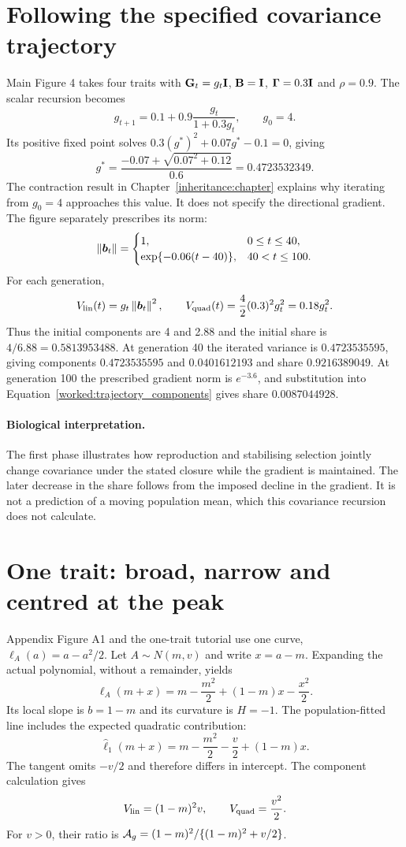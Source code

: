 \section{Following the specified covariance trajectory}
\label{worked:main4}

Main Figure 4 takes four traits with $\mathbf{G}_t=g_t\mathbf{I}$, $\mathbf{B}=\mathbf{I}$,
$\boldsymbol{\Gamma}=0.3\mathbf{I}$ and $\rho=0.9$. The scalar recursion becomes
\[
 g_{t+1}=0.1+0.9\frac{g_t}{1+0.3g_t},\qquad g_0=4.
\]
Its positive fixed point solves
$0.3(g^*)^2+0.07g^*-0.1=0$, giving
\[
 g^*=\frac{-0.07+\sqrt{0.07^2+0.12}}{0.6}
     =0.4723532349.
\]
The contraction result in Chapter~\ref{inheritance:chapter} explains why iterating from $g_0=4$ approaches this value. It does not specify the directional gradient. The figure separately prescribes its norm:
\[
 \left\lVert \boldsymbol{b}_t\right\rVert=
 \begin{cases}
 1,&0\leq t\leq40,\\
 \exp\{-0.06(t-40)\},&40<t\leq100.
 \end{cases}
\]
For each generation,
\begin{equation}
 V_{\mathrm{lin}}(t)=g_t\left\lVert \boldsymbol{b}_t\right\rVert^2,\qquad
 V_{\mathrm{quad}}(t)=\frac{4}{2}(0.3)^2g_t^2=0.18g_t^2.
 \label{worked:trajectory_components}
\end{equation}
Thus the initial components are 4 and 2.88 and the initial share is
$4/6.88=0.5813953488$. At generation 40 the iterated variance is
$0.4723535595$, giving components $0.4723535595$ and $0.0401612193$ and share
$0.9216389049$. At generation 100 the prescribed gradient norm is
$e^{-3.6}$, and substitution into Equation~\eqref{worked:trajectory_components}
gives share $0.0087044928$.

\paragraph{Biological interpretation.}
The first phase illustrates how reproduction and stabilising selection jointly change covariance under the stated closure while the gradient is maintained. The later decrease in the share follows from the imposed decline in the gradient. It is not a prediction of a moving population mean, which this covariance recursion does not calculate.

\section{One trait: broad, narrow and centred at the peak}
\label{worked:one_trait}

Appendix Figure A1 and the one-trait tutorial use one curve,
$\ell_A(a)=a-a^2/2$. Let $A\sim N(m,v)$ and write $x=a-m$. Expanding the actual polynomial, without a remainder, yields
\[
 \ell_A(m+x)=m-\frac{m^2}{2}+(1-m)x-\frac{x^2}{2}.
\]
Its local slope is $b=1-m$ and its curvature is $H=-1$. The population-fitted line includes the expected quadratic contribution:
\[
 \widehat\ell_1(m+x)
 =m-\frac{m^2}{2}-\frac v2+(1-m)x.
\]
The tangent omits $-v/2$ and therefore differs in intercept. The component calculation gives
\[
 V_{\mathrm{lin}}=(1-m)^2v,\qquad
 V_{\mathrm{quad}}=\frac{v^2}{2}.
\]
For $v>0$, their ratio is
$\mathcal A_g=(1-m)^2/\{(1-m)^2+v/2\}$.

